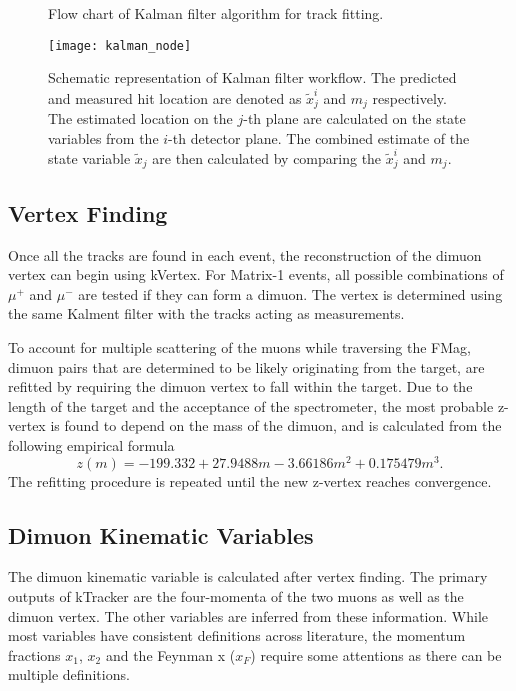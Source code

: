 \documentclass[../main.tex]{subfiles}
\begin{document}
\begin{figure}
	\centering
	
	\caption{Flow chart of Kalman filter algorithm for track fitting.}
	\label{fig:kalman_flowchart}
\end{figure}

\begin{figure}
	\centering
	\texttt{[image: kalman\_node]}
	\caption{Schematic representation of Kalman filter workflow. The predicted and measured hit location
		are denoted as $\tilde{x}^i_j$ and $m_j$ respectively. The estimated location on the $j$-th plane
		are calculated on the state variables from the $i$-th detector plane. The combined estimate of the
		state variable $\tilde{x}_j$ are then calculated by comparing the $\tilde{x}^i_j$ and $m_j$.}
	\label{fig:kalman_node}
\end{figure}

\subsection{Vertex Finding}
Once all the tracks are found in each event, the reconstruction of the dimuon vertex can begin using kVertex.
For Matrix-1 events, all possible combinations of $\mu^+$ and $\mu^-$ are tested if they can form
a dimuon. The vertex is determined using the same Kalment filter with the tracks acting as measurements.

To account for multiple scattering of the muons while traversing the FMag, dimuon pairs that are
determined to be likely originating from the target, are refitted by requiring the dimuon vertex to
fall within the target. Due to the length of the target and the acceptance of the spectrometer,
the most probable z-vertex is found to depend on the mass of the dimuon, and is calculated from the
following empirical formula \cite{kun-1283}
\begin{equation}
	z\left(m\right) = -199.332 + 27.9488 m - 3.66186 m^2 + 0.175479 m^3.
\end{equation}
The refitting procedure is repeated until the new z-vertex reaches convergence.


\subsection{Dimuon Kinematic Variables}
\label{subsec:def_kinematic}
The dimuon kinematic variable is calculated after vertex finding. The primary outputs of kTracker
are the four-momenta of the two muons as well as the dimuon vertex. The other variables are inferred
from these information. While most variables have consistent definitions across literature, the momentum
fractions $x_1$, $x_2$ and the Feynman x ($x_F$) require some attentions as there can be multiple definitions.
\end{document}
